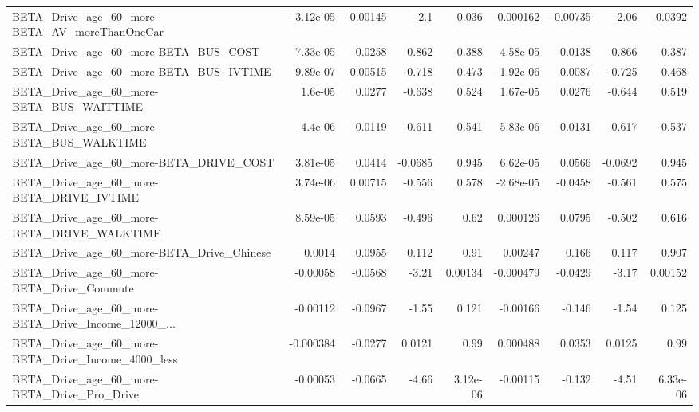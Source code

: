\begin{tabular}{lrrrrrrrr}
BETA\_Drive\_age\_60\_more-BETA\_AV\_moreThanOneCar      &   -3.12e-05 &     -0.00145 &      -2.1 &    0.036 &  -0.000162 &    -0.00735 &        -2.06 &        0.0392 \\
BETA\_Drive\_age\_60\_more-BETA\_BUS\_COST               &    7.33e-05 &       0.0258 &     0.862 &    0.388 &   4.58e-05 &      0.0138 &        0.866 &         0.387 \\
BETA\_Drive\_age\_60\_more-BETA\_BUS\_IVTIME             &    9.89e-07 &      0.00515 &    -0.718 &    0.473 &  -1.92e-06 &     -0.0087 &       -0.725 &         0.468 \\
BETA\_Drive\_age\_60\_more-BETA\_BUS\_WAITTIME           &     1.6e-05 &       0.0277 &    -0.638 &    0.524 &   1.67e-05 &      0.0276 &       -0.644 &         0.519 \\
BETA\_Drive\_age\_60\_more-BETA\_BUS\_WALKTIME           &     4.4e-06 &       0.0119 &    -0.611 &    0.541 &   5.83e-06 &      0.0131 &       -0.617 &         0.537 \\
BETA\_Drive\_age\_60\_more-BETA\_DRIVE\_COST             &    3.81e-05 &       0.0414 &   -0.0685 &    0.945 &   6.62e-05 &      0.0566 &      -0.0692 &         0.945 \\
BETA\_Drive\_age\_60\_more-BETA\_DRIVE\_IVTIME           &    3.74e-06 &      0.00715 &    -0.556 &    0.578 &  -2.68e-05 &     -0.0458 &       -0.561 &         0.575 \\
BETA\_Drive\_age\_60\_more-BETA\_DRIVE\_WALKTIME         &    8.59e-05 &       0.0593 &    -0.496 &     0.62 &   0.000126 &      0.0795 &       -0.502 &         0.616 \\
BETA\_Drive\_age\_60\_more-BETA\_Drive\_Chinese          &      0.0014 &       0.0955 &     0.112 &     0.91 &    0.00247 &       0.166 &        0.117 &         0.907 \\
BETA\_Drive\_age\_60\_more-BETA\_Drive\_Commute          &    -0.00058 &      -0.0568 &     -3.21 &  0.00134 &  -0.000479 &     -0.0429 &        -3.17 &       0.00152 \\
BETA\_Drive\_age\_60\_more-BETA\_Drive\_Income\_12000\_... &    -0.00112 &      -0.0967 &     -1.55 &    0.121 &   -0.00166 &      -0.146 &        -1.54 &         0.125 \\
BETA\_Drive\_age\_60\_more-BETA\_Drive\_Income\_4000\_less &   -0.000384 &      -0.0277 &    0.0121 &     0.99 &   0.000488 &      0.0353 &       0.0125 &          0.99 \\
BETA\_Drive\_age\_60\_more-BETA\_Drive\_Pro\_Drive        &    -0.00053 &      -0.0665 &     -4.66 & 3.12e-06 &   -0.00115 &      -0.132 &        -4.51 &      6.33e-06 \\

\end{tabular}
